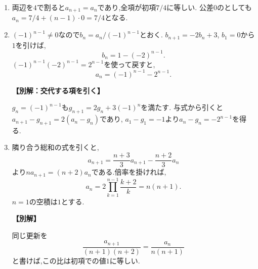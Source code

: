 \begin{enumerate}[label=\textbf{問\arabic*.},leftmargin=3.8em,format=\bookitemlink{practice-basic}{solution}{problem}]
          \item 両辺を$4$で割ると$a_{n+1}=a_n$であり,全項が初項$7/4$に等しい.
                  公差$0$のとしても$a_n=7/4+(n-1)\cdot0=7/4$となる.

          \item $(-1)^{n-1}\ne0$なので$b_n=a_n/(-1)^{n-1}$とおく.
                  $b_{n+1}=-2b_n+3$, $b_1=0$から$1$を引けば,
                  \[
                    b_n=1-(-2)^{n-1}.
                  \]
                  $(-1)^{n-1}(-2)^{n-1}=2^{n-1}$を使って戻すと,
                  \[
                    a_n=(-1)^{n-1}-2^{n-1}.
                  \]
                  \par\smallskip\noindent\textbf{【別解：交代する項を引く】}\par
                  $g_n=(-1)^{n-1}$も$g_{n+1}=2g_n+3(-1)^n$を満たす.
                  与式から引くと$a_{n+1}-g_{n+1}=2(a_n-g_n)$であり,
                  $a_1-g_1=-1$より$a_n-g_n=-2^{n-1}$を得る.

          \item 隣り合う総和の式を引くと,
                  \[
                    a_{n+1}=\frac{n+3}3a_{n+1}-\frac{n+2}3a_n
                  \]
                  より$na_{n+1}=(n+2)a_n$である.倍率を掛ければ,
                  \[
                    a_n=2\prod_{k=1}^{n-1}\frac{k+2}{k}=n(n+1).
                  \]
                  $n=1$の空積は$1$とする.
                  \par\smallskip\noindent\textbf{【別解】}\par
                  同じ更新を
                  \[
                    \frac{a_{n+1}}{(n+1)(n+2)}=\frac{a_n}{n(n+1)}
                  \]
                  と書けば,この比は初項での値$1$に等しい.
        \end{enumerate}
